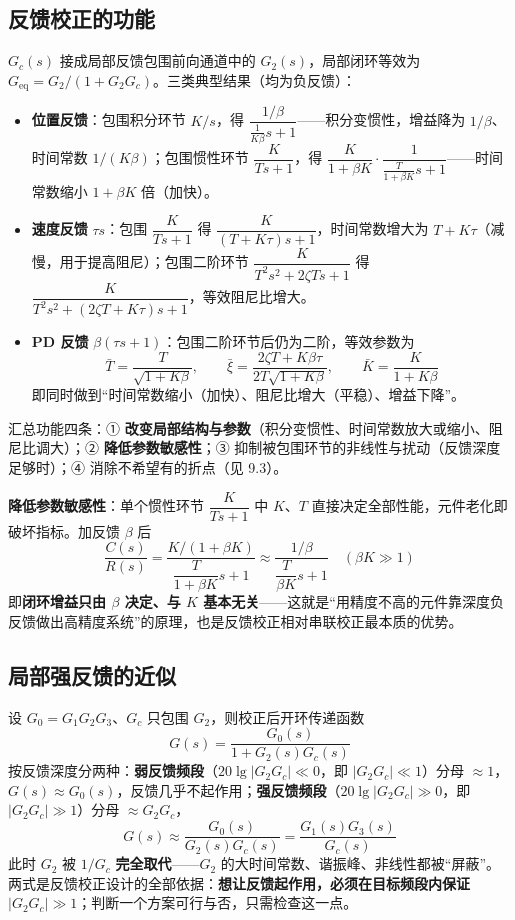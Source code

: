 \subsection{反馈校正的功能}
$G_c(s)$ 接成局部反馈包围前向通道中的 $G_2(s)$，局部闭环等效为 $G_{\text{eq}}=G_2/(1+G_2G_c)$。三类典型结果（均为负反馈）：
\begin{itemize}
    \item \textbf{位置反馈}：包围积分环节 $K/s$，得 $\dfrac{1/\beta}{\frac{1}{K\beta}s+1}$——积分变惯性，增益降为 $1/\beta$、时间常数 $1/(K\beta)$；包围惯性环节 $\dfrac{K}{Ts+1}$，得 $\dfrac{K}{1+\beta K}\cdot\dfrac{1}{\frac{T}{1+\beta K}s+1}$——时间常数缩小 $1+\beta K$ 倍（加快）。
    \item \textbf{速度反馈} $\tau s$：包围 $\dfrac{K}{Ts+1}$ 得 $\dfrac{K}{(T+K\tau)s+1}$，时间常数增大为 $T+K\tau$（减慢，用于提高阻尼）；包围二阶环节 $\dfrac{K}{T^2s^2+2\zeta Ts+1}$ 得 $\dfrac{K}{T^2s^2+(2\zeta T+K\tau)s+1}$，等效阻尼比增大。
    \item \textbf{PD 反馈} $\beta(\tau s+1)$：包围二阶环节后仍为二阶，等效参数为
    \[
    \bar T=\frac{T}{\sqrt{1+K\beta}},\qquad
    \bar\xi=\frac{2\zeta T+K\beta\tau}{2T\sqrt{1+K\beta}},\qquad
    \bar K=\frac{K}{1+K\beta}
    \]
    即同时做到“时间常数缩小（加快）、阻尼比增大（平稳）、增益下降”。
\end{itemize}

\noindent 汇总功能四条：① \textbf{改变局部结构与参数}（积分变惯性、时间常数放大或缩小、阻尼比调大）；② \textbf{降低参数敏感性}；③ 抑制被包围环节的非线性与扰动（反馈深度足够时）；④ 消除不希望有的折点（见 9.3）。

\noindent\textbf{降低参数敏感性}：单个惯性环节 $\dfrac{K}{Ts+1}$ 中 $K$、$T$ 直接决定全部性能，元件老化即破坏指标。加反馈 $\beta$ 后
\[
\frac{C(s)}{R(s)}=\frac{K/(1+\beta K)}{\dfrac{T}{1+\beta K}s+1}
\approx\frac{1/\beta}{\dfrac{T}{\beta K}s+1}\quad(\beta K\gg1)
\]
即\textbf{闭环增益只由 $\beta$ 决定、与 $K$ 基本无关}——这就是“用精度不高的元件靠深度负反馈做出高精度系统”的原理，也是反馈校正相对串联校正最本质的优势。

\subsection{局部强反馈的近似}
设 $G_0=G_1G_2G_3$、$G_c$ 只包围 $G_2$，则校正后开环传递函数
\[
\boxed{\ G(s)=\frac{G_0(s)}{1+G_2(s)G_c(s)}\ }
\]
按反馈深度分两种：\textbf{弱反馈频段}（$20\lg|G_2G_c|\ll0$，即 $|G_2G_c|\ll1$）分母 $\approx1$，$G(s)\approx G_0(s)$，反馈几乎不起作用；\textbf{强反馈频段}（$20\lg|G_2G_c|\gg0$，即 $|G_2G_c|\gg1$）分母 $\approx G_2G_c$，
\[
G(s)\approx\frac{G_0(s)}{G_2(s)G_c(s)}=\frac{G_1(s)G_3(s)}{G_c(s)}
\]
此时 $G_2$ 被 $1/G_c$ \textbf{完全取代}——$G_2$ 的大时间常数、谐振峰、非线性都被“屏蔽”。两式是反馈校正设计的全部依据：\textbf{想让反馈起作用，必须在目标频段内保证 $|G_2G_c|\gg1$}；判断一个方案可行与否，只需检查这一点。

